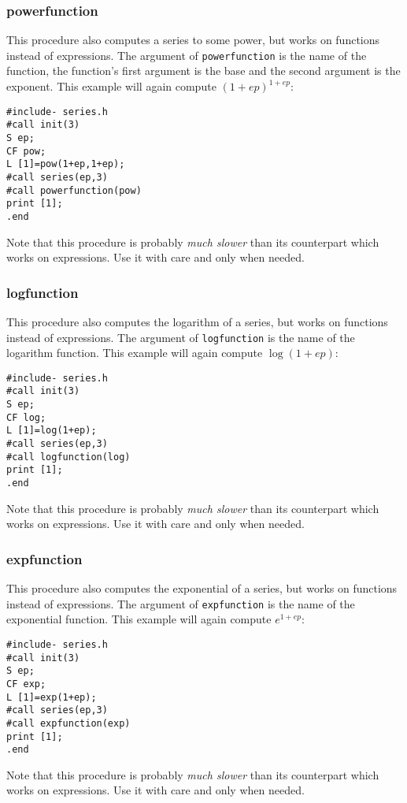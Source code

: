 \documentclass{article}
\begin{document}
\subsubsection{powerfunction}
\label{sec:pow_fun}

This procedure also computes a series to some power, but works on
functions instead of expressions. The argument of {\tt powerfunction} is
the name of the function, the function's first argument is the base and
the second argument is the exponent. This example will again compute $(1+ep)^{1+ep}$:
\begin{verbatim}
#include- series.h
#call init(3)
S ep;
CF pow;
L [1]=pow(1+ep,1+ep);
#call series(ep,3)
#call powerfunction(pow)
print [1];
.end
\end{verbatim}
Note that this procedure is probably {\it much slower} than its
counterpart which works on expressions. Use it with care and only when needed.

\subsubsection{logfunction}
\label{sec:log_fun}

This procedure also computes the logarithm of a series, but works on
functions instead of expressions. The argument of {\tt logfunction} is
the name of the logarithm function. This example will again compute $\log(1+ep)$:
\begin{verbatim}
#include- series.h
#call init(3)
S ep;
CF log;
L [1]=log(1+ep);
#call series(ep,3)
#call logfunction(log)
print [1];
.end
\end{verbatim}
Note that this procedure is probably {\it much slower} than its
counterpart which works on expressions. Use it with care and only when needed.

\subsubsection{expfunction}
\label{sec:exp_fun}

This procedure also computes the exponential of a series, but works on
functions instead of expressions. The argument of {\tt expfunction} is
the name of the exponential function. This example will again compute $e^{1+ep}$:
\begin{verbatim}
#include- series.h
#call init(3)
S ep;
CF exp;
L [1]=exp(1+ep);
#call series(ep,3)
#call expfunction(exp)
print [1];
.end
\end{verbatim}
Note that this procedure is probably {\it much slower} than its
counterpart which works on expressions. Use it with care and only when needed.
\end{document}

